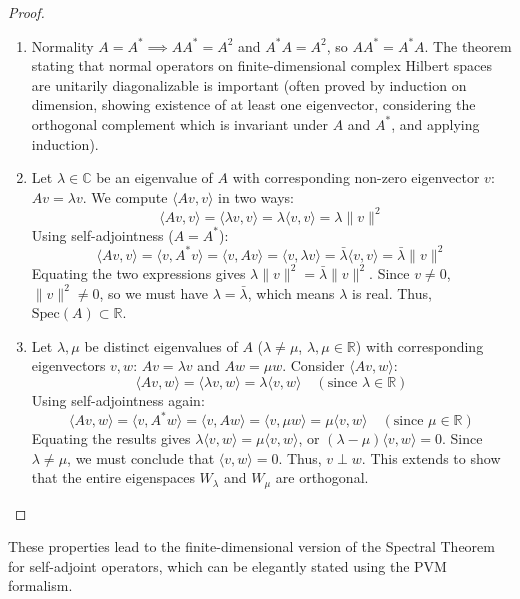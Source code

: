 \begin{proof}
\, 
\begin{enumerate}
    \item Normality $A=A^* \implies AA^* = A^2$ and $A^*A = A^2$, so $AA^*=A^*A$. The theorem stating that normal operators on finite-dimensional complex Hilbert spaces are unitarily diagonalizable is important (often proved by induction on dimension, showing existence of at least one eigenvector, considering the orthogonal complement which is invariant under $A$ and $A^*$, and applying induction).

    \item Let $\lambda \in \mathbb{C}$ be an eigenvalue of $A$ with corresponding non-zero eigenvector $v$: $Av = \lambda v$. We compute $\langle Av, v \rangle$ in two ways:
    \[ \langle Av, v \rangle = \langle \lambda v, v \rangle = \lambda \langle v, v \rangle = \lambda \|v\|^2 \]
    Using self-adjointness ($A=A^*$):
    \[ \langle Av, v \rangle = \langle v, A^*v \rangle = \langle v, Av \rangle = \langle v, \lambda v \rangle = \bar{\lambda} \langle v, v \rangle = \bar{\lambda} \|v\|^2 \]
    Equating the two expressions gives $\lambda \|v\|^2 = \bar{\lambda} \|v\|^2$. Since $v \neq 0$, $\|v\|^2 \neq 0$, so we must have $\lambda = \bar{\lambda}$, which means $\lambda$ is real. Thus, $\text{Spec}(A) \subset \mathbb{R}$.

    \item Let $\lambda, \mu$ be distinct eigenvalues of $A$ ($\lambda \neq \mu$, $\lambda, \mu \in \mathbb{R}$) with corresponding eigenvectors $v, w$: $Av = \lambda v$ and $Aw = \mu w$. Consider $\langle Av, w \rangle$:
    \[ \langle Av, w \rangle = \langle \lambda v, w \rangle = \lambda \langle v, w \rangle \quad (\text{since } \lambda \in \mathbb{R}) \]
    Using self-adjointness again:
    \[ \langle Av, w \rangle = \langle v, A^*w \rangle = \langle v, Aw \rangle = \langle v, \mu w \rangle = \mu \langle v, w \rangle \quad (\text{since } \mu \in \mathbb{R}) \]
    Equating the results gives $\lambda \langle v, w \rangle = \mu \langle v, w \rangle$, or $(\lambda - \mu) \langle v, w \rangle = 0$. Since $\lambda \neq \mu$, we must conclude that $\langle v, w \rangle = 0$. Thus, $v \perp w$. This extends to show that the entire eigenspaces $W_\lambda$ and $W_\mu$ are orthogonal.
\end{enumerate}
\end{proof}

These properties lead to the finite-dimensional version of the Spectral Theorem for self-adjoint operators, which can be elegantly stated using the PVM formalism.

